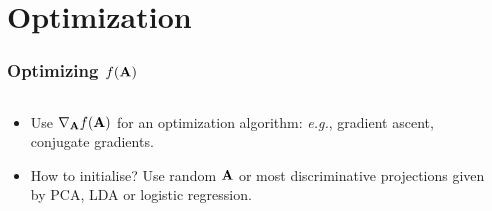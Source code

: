\documentclass{beamer}
\begin{document}
  \section{Optimization}
   \begin{frame}
      \frametitle{Optimizing $f(\mathbf{A})$}
      \begin{columns}
		\begin{column}{6cm}
			 \begin{itemize}
			    \item Use $\nabla_{\mathbf{A}}f(\mathbf{A})$ for an optimization algorithm: \textit{e.g.}, gradient ascent, conjugate gradients. 
			    \item How to initialise? Use random $\mathbf{A}$ or most discriminative projections given by PCA, LDA or logistic regression.
			 \end{itemize}
		\end{column}
		\begin{column}{6cm}
		\end{column}
	\end{columns}

   \end{frame} 
\end{document}
